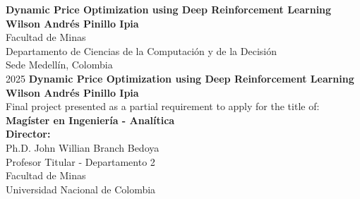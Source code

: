 \documentclass[10pt,english,fleqn,openany,twoside,letterpaper]{book}
\newcommand{\studentname}{}
\newcommand{\academictitle}{}
\newcommand{\thesisnameeng}{}
\newcommand{\director}{}
\newcommand{\directortitle}{}
\newcommand{\issuedate}{}
\newcommand{\sede}{}
\newcommand{\department}{}
\newcommand{\departmenttwo}{} %
\newcommand{\faculty}{}
\newcommand{\university}{Universidad Nacional de Colombia}
\renewcommand{\studentname}{Wilson Andrés Pinillo Ipia}
\renewcommand{\thesisnameeng}{Dynamic Price Optimization using Deep Reinforcement Learning}
\renewcommand{\issuedate}{2025}
\renewcommand{\director}{Ph.D. John Willian Branch Bedoya}
\renewcommand{\directortitle}{Profesor Titular}
\renewcommand{\academictitle}{Magíster en Ingeniería - Analítica}
\renewcommand{\sede}{Sede Medellín}
\renewcommand{\department}{Departamento de Ciencias de la Computación y de la Decisión}
\renewcommand{\departmenttwo}{Departamento 2} %
\renewcommand{\faculty}{Facultad de Minas}
\begin{document}
\renewcommand{\listfigurename}{\sffamily List of Figures}
\renewcommand{\listtablename}{\sffamily List of Tables}
\renewcommand{\contentsname}{\sffamily Contents}
\renewcommand{\chaptername}{\sffamily Chapter}
\renewcommand{\tablename}{\scriptsize \centering \textbf{Table}}
\renewcommand{\figurename}{\scriptsize \centering \textbf{Figure}}
\renewcommand{\appendixname}{\sffamily Appendix}

\renewcommand{\bibname}{\sffamily References}

{\newpage
\thispagestyle{empty}
\begin{center}
\begin{figure}
\centering
{}%
\end{figure}
\textbf{\Huge \thesisnameeng} \\ 
\vspace{2.5cm}
\textbf{\Large \studentname} \\
\vspace{5.0cm}
\faculty \\ \department \\
\sede, Colombia \\
\issuedate
\newpage 
\thispagestyle{empty}
\vspace{2.0cm}
\textbf{\Huge \thesisnameeng} \\
\vspace{2.0cm}
\textbf{\Large \studentname} \\
\vspace{2.0cm}
\small Final project presented as a partial requirement to apply for the title of: \\
{\bfseries \academictitle}\\
\vspace{2.0cm}
\textbf{Director:} \\
\director \\
\directortitle \; - \departmenttwo \\
\faculty \\
\university \\ 
\vspace{0.5cm}

\end{center}}
\end{document}
